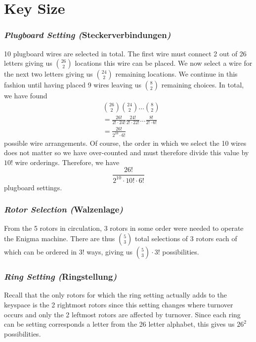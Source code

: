 \section{Key Size}

\subsubsection{\emph{Plugboard Setting (}Steckerverbindungen\emph{)}}
10 plugboard wires are selected in total. The first wire must connect
2 out of 26 letters giving us ${26\choose2}$ locations this wire can
be placed. We now select a wire for the next two letters giving us
${24\choose2}$ remaining locations. We continue in this fashion until
having placed 9 wires leaving us ${8\choose2}$ remaining choices. In
total, we have found
\begin{align*}
  & {26\choose2}{24\choose2}\dots{8\choose2}                                  \\
  & =\frac{26!}{2!\cdot 24!}\frac{24!}{2!\cdot 22!}\dots\frac{8!}{2!\cdot 6!} \\
  & =\frac{26!}{2^{10}\cdot6!}
\end{align*}
possible wire arrangements. Of course, the order in which we select
the 10 wires does not matter so we have over-counted and must
therefore divide this value by $10!$ wire orderings. Therefore, we have
\[
  \frac{26!}{2^{10}\cdot 10! \cdot 6!}
\]
plugboard settings.

\subsubsection{\emph{Rotor Selection (}Walzenlage\emph{)}}
From the 5 rotors in circulation, 3 rotors in some order were needed
to operate the Enigma machine. There are thus ${5}\choose{3}$ total
selections of 3 rotors each of which can be ordered in $3!$ ways,
giving us ${5\choose3}\cdot{3!}$ possibilities.

\subsubsection{\emph{Ring Setting (}Ringstellung\emph{)}}
Recall that the only rotors for which the ring setting actually adds
to the keyspace is the 2 rightmost rotors since this setting changes
where turnover occurs and only the 2 leftmost rotors are affected by
turnover. Since each ring can be setting corresponds a letter from
the 26 letter alphabet, this gives us $26^2$ possibilities.

